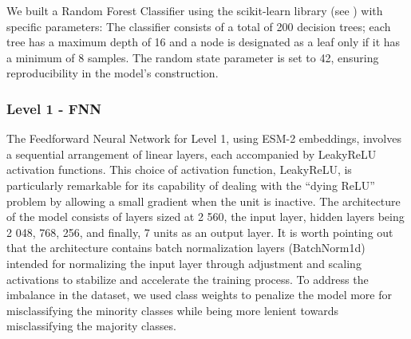 \documentclass{bioinfo}
\begin{document}
\begin{methods}
We built a Random Forest Classifier using the scikit-learn library (see \cite{scikit-learn}) with specific parameters: 
The classifier consists of a total of 200 decision trees; each tree has a
maximum depth of 16 and a node is designated as a leaf only if it has a
minimum of 8 samples. The random state parameter is set to 42, ensuring
reproducibility in the model's construction.


\subsubsection{Level 1 - FNN}\label{sec:level1_methods}
The Feedforward Neural Network for Level 1, using ESM-2 embeddings, involves a sequential arrangement of linear layers, each accompanied by LeakyReLU activation functions.
This choice of activation function, LeakyReLU, is particularly remarkable for its capability of dealing with the ``dying ReLU'' problem by 
allowing a small gradient when the unit is inactive. 
The architecture of the model consists of layers sized at 2 560, the input layer, hidden layers being 2 048,
768, 256, and finally, 7 units as an output layer.
It is worth pointing out that the architecture contains batch normalization layers (BatchNorm1d) intended for 
normalizing the input layer through adjustment and scaling activations to stabilize and accelerate the training process.
To address the imbalance in the dataset, we used class weights to penalize the model more for misclassifying the minority classes
while being more lenient towards misclassifying the majority classes.


\end{methods}
\end{document}
